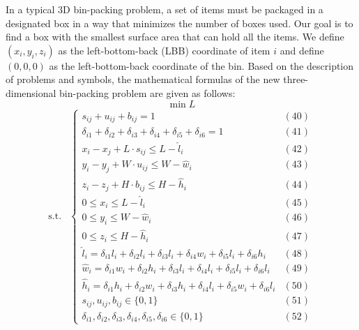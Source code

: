 \documentclass{mcmthesis}
\begin{document}
\noindent In a typical 3D bin-packing problem, a set of items must be packaged in a designated box in a way that minimizes the number of boxes used. Our goal is to find a box with the smallest surface area that can hold all the items. We define $( x_i, y_i , z_i )$ as the left-bottom-back (LBB) coordinate of item $i$ and define $(0, 0, 0)$ as the left-bottom-back coordinate of the bin. Based on the description of problems and symbols, the mathematical formulas of the new three-dimensional bin-packing problem are given as follows: 
\[
\min L
\]
\[
\begin{aligned}
\text{s.t.}&
\left\{
\begin{array}{lr}
s _ { i j } + u _ { i j } + b _ { i j } = 1 &(40)\\
\delta _ { i 1 } + \delta _ { i 2 } + \delta _ { i 3 } + \delta _ { i 4 } + \delta _ { i 5 } + \delta _ { i 6 } = 1&(41)\\
x _ { i } - x _ { j } + L \cdot s _ { i j } \leq L - \hat { l } _ { i } &(42)\\
y _ { i } - y _ { j } + W \cdot u _ { i j } \leq W - \hat { w } _ { i }&(43)\\
z _ { i } - z _ { j } + H \cdot b _ { i j } \leq H - \hat { h } _ { i }&(44)\\
0 \leq x _ { i } \leq L - \hat { l } _ { i }&(45)\\
0 \leq y _ { i } \leq W - \hat { w } _ { i }&(46)\\
0 \leq z _ { i } \leq H - \hat { h } _ { i } &(47)\\
\hat { l } _ { i } = \delta _ { i 1 } l _ { i } + \delta _ { i 2 } l _ { i } + \delta _ { i 3 } l _ { i } + \delta _ { i 4 } w _ { i } + \delta _ { i 5 } l _ { i } + \delta _ { i 6 } h _ { i } &(48)\\
 \hat { w } _ { i } = \delta _ { i 1 } w _ { i } + \delta _ { i 2 } h _ { i } + \delta _ { i 3 } l _ { i } + \delta _ { i 4 } l _ { i } + \delta _ { i 5 } l _ { i } + \delta _ { i 6 } l _ { i } &(49)\\
\hat { h } _ { i } = \delta _ { i 1 } h _ { i } + \delta _ { i 2 } w _ { i } + \delta _ { i 3 } h _ { i } + \delta _ { i 4 } l _ { i } + \delta _ { i 5 } w _ { i } + \delta _ { i 6 } l _ { i } &(50)\\
s _ { i j } , u _ { i j } , b _ { i j } \in \{ 0,1 \} &(51)\\
 \delta _ { i 1 } , \delta _ { i 2 } , \delta _ { i 3 } , \delta _ { i 4 } , \delta _ { i 5 } , \delta _ { i 6 } \in \{ 0,1 \}&(52)
\end{array}
\right.
\end{aligned}
\]
\end{document}
